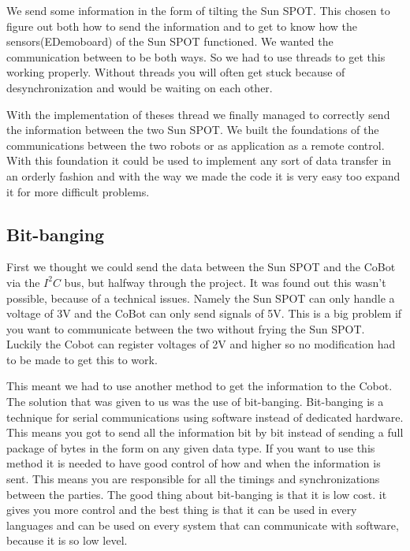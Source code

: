 \documentclass[a4paper,10pt]{article} %
\begin{document}
We send some information in the form of tilting the Sun SPOT. This chosen to
figure out both how to send the information and to get to know how the
sensors(EDemoboard) of the Sun SPOT functioned. We wanted the communication
between to be both ways. So we had to use threads to get this working properly.
Without threads you will often get stuck because of desynchronization and would
be waiting on each other.

With the implementation of theses thread we finally managed to correctly send
the information between the two Sun SPOT. We built the foundations of the
communications between the two robots or as application as a remote control.
With this foundation it could be used to implement any sort of data transfer in
an orderly fashion and with the way we made the code it is very easy too expand
it for more difficult problems.


\subsection{Bit-banging} %
\label{subsec:bitbang}


First we thought we could send the data between the Sun SPOT and the CoBot via
the $I^2C$ bus, but halfway through the project. It was found out this wasn't
possible, because of a technical issues. Namely the Sun SPOT can only handle a
voltage of 3V and the CoBot can only send signals of 5V. This is a big problem
if you want to communicate between the two without frying the Sun SPOT. Luckily
the Cobot can register voltages of 2V and higher so no modification had to be
made to get this to work.

This meant we had to use another method to get the information to the Cobot. The
solution that was given to us was the use of bit-banging. Bit-banging is a
technique for serial communications using software instead of dedicated
hardware. This means you got to send all the information bit by bit instead of
sending a full package of bytes in the form on any given data type. If you want
to use this method it is needed to have good control of how and when the
information is sent. This means you are responsible for all the timings and
synchronizations between the parties. The good thing about bit-banging is that
it is low cost. it gives you more control and the best thing is that it can be
used in every languages and can be used on every system that can communicate
with software, because it is so low level.
\end{document}
